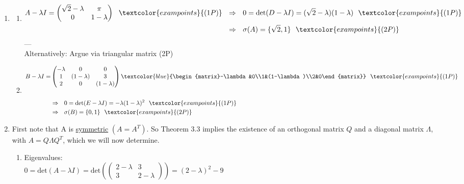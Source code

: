 {\color{solution}
\begin{enumerate}
	\item \begin{enumerate}
		\item 
		\begin{align*}
		A-\lambda I=\begin{pmatrix}\sqrt{2}-\lambda&\pi\\0&1-\lambda\end{pmatrix}~~\textcolor{exampoints}{(1P)}~~&\Rightarrow~~0
		=\text{det}(D-\lambda I)
		=(\sqrt{2}-\lambda)(1-\lambda)~~\textcolor{exampoints}{(1P)}\\
		&\Rightarrow~~\sigma(A)=\{\sqrt{2},1\}~~\textcolor{exampoints}{(2P)}
		\end{align*}
		---\\
		Alternatively: Argue via triangular matrix \textcolor{exampoints}{(2P)}
		~\\
		\item 
		\begin{align*}
		B-\lambda I=&\begin{pmatrix}-\lambda&0&0\\1&(1-\lambda)&3\\2&0&(1-\lambda)\end{pmatrix}\textcolor{blue}{\begin{matrix}-\lambda&0\\1&(1-\lambda)\\2&0\end{matrix}}~~\textcolor{exampoints}{(1P)}~~\\
		&\\
		&\Rightarrow~~0
		=\text{det}(E-\lambda I)
		=-\lambda(1-\lambda)^2~~\textcolor{exampoints}{(1P)}\\
		&\Rightarrow~~\sigma(B)=\{0,1\}~~\textcolor{exampoints}{(2P)}
		\end{align*}
	\end{enumerate}
\item First note that A is \underline{symmetric} $(A=A^T)$. So Theorem 3.3 implies the existence of an orthogonal matrix $Q$ and a diagonal matrix $\Lambda$, with $A=Q\Lambda Q^T$, which we will now determine.
\begin{enumerate}
	\item Eigenvalues:\\
	$0= \text{det}(A-\lambda I) = \text{det}\left(\begin{pmatrix}2-\lambda&3\\3&2-\lambda\end{pmatrix}\right) = (2-\lambda)^2-9$\\

\end{enumerate}
\end{enumerate}}
